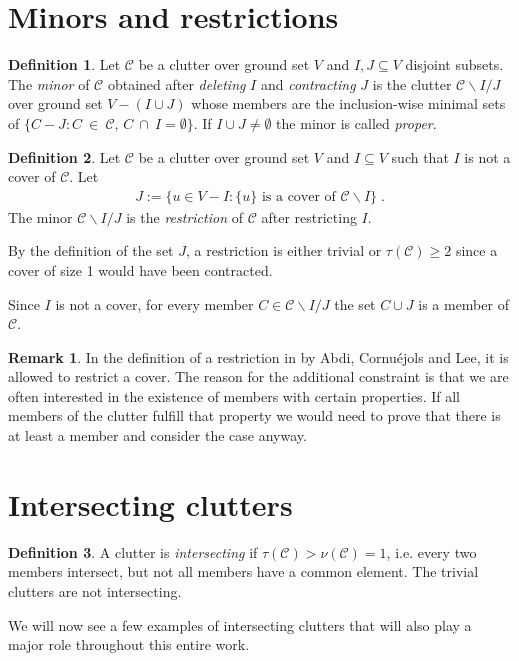 \documentclass[a4paper, 12pt]{scrbook}
\theoremstyle{definition}
\newtheorem*{definition}{Definition}
\newtheorem*{remark}{Remark}
\begin{document}
\section{Minors and restrictions}
\begin{definition}
    Let $\mathcal{C}$ be a clutter over ground set $V$ and $I, J \subseteq V$ disjoint subsets.
    The \emph{minor} of $\mathcal{C}$ obtained after \emph{deleting} $I$ and \emph{contracting} $J$ is the clutter $\mathcal{C} \backslash I / J$ over ground set $V - (I \cup J)$ whose members are the inclusion-wise minimal sets of $\{C-J : C~\in~\mathcal{C},\, C~\cap~I = \emptyset\}$.
    If $I \cup J \neq \emptyset$ the minor is called \emph{proper}.
\end{definition}

\begin{definition}
    Let $\mathcal{C}$ be a clutter over ground set $V$ and $I \subseteq V$ such that $I$ is not a cover of $\mathcal{C}$.
    Let
    \begin{align*}
        J := \{u \in V-I : \{u\} \text{ is a cover of } \mathcal{C} \backslash I\} \;.
    \end{align*}
    The minor $\mathcal{C} \backslash I / J$ is the \emph{restriction} of $\mathcal{C}$ after restricting $I$.
\end{definition}

By the definition of the set $J$, a restriction is either trivial or $\tau(\mathcal{C}) \geq 2$ since a cover of size 1 would have been contracted.

Since $I$ is not a cover, for every member $C \in \mathcal{C} \backslash I /J$ the set $C \cup J$ is a member of $\mathcal{C}$.

\begin{remark}
    In the definition of a restriction in \cite{restrictions} by Abdi, Cornuéjols and Lee, it is allowed to restrict a cover.
    The reason for the additional constraint is that we are often interested in the existence of members with certain properties.
    If all members of the clutter fulfill that property we would need to prove that there is at least a member and consider the case anyway.
\end{remark}


\section{Intersecting clutters}
\begin{definition}
    A clutter is \emph{intersecting} if $\tau(\mathcal{C}) > \nu(\mathcal{C}) = 1$, i.e. every two members intersect, but not all members have a common element.
    The trivial clutters are not intersecting.
\end{definition}
We will now see a few examples of intersecting clutters that will also play a major role throughout this entire work.
\end{document}
